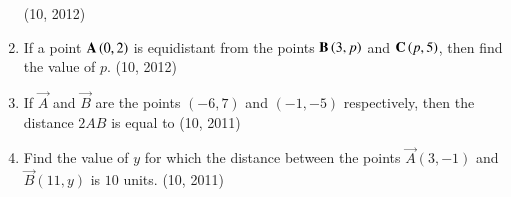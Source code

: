 \begin{enumerate}[label=\thesubsection.\arabic*, ref=\thesubsection.\theenumi]
\hfill (10, 2012)
\item If a point $\mathbf{A}\left(0,2\right)$ is equidistant from the points $\mathbf{B}\left(3,p\right)$ and $\mathbf{C}\left(p,5\right)$, then find the value of $p$. 
\hfill (10, 2012)
\item If $\vec{A}$ and $\vec{B}$ are the points $(-6, 7)$ and $(-1, -5)$ respectively, then the distance $2AB$ is equal to
\hfill (10, 2011)
\item Find the value of $y$ for which the distance between the points $\vec{A}(3, -1)$ and $\vec{B}(11, y)$ is $10$ units.
\hfill (10, 2011)
\end{enumerate}
